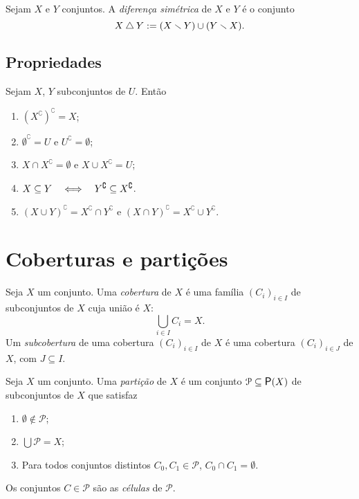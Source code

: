 \begin{definition}
Sejam $X$ e $Y$ conjuntos. A \emph{diferença simétrica} de $X$ e $Y$ é o conjunto
	\begin{equation*}
	X \mathbin{\triangle} Y := (X \smallsetminus Y) \cup (Y \smallsetminus X).
	\end{equation*}
\end{definition}

\subsection{Propriedades}

\begin{proposition}
Sejam $X$, $Y$ subconjuntos de $U$. Então
	\begin{enumerate}
	\item $(X^\complement)^\complement = X$;
	\item $\emptyset^\complement = U$ e $U^\complement = \emptyset$;
	\item $X \cap X^\complement = \emptyset$ e $X \cup X^\complement = U$;
	\item $X \subseteq Y \quad \Longleftrightarrow \quad Y^\complement \subseteq X^\complement$.
	\item $(X \cup Y)^\complement = X^\complement \cap Y^\complement$ e $(X \cap Y)^\complement = X^\complement \cup Y^\complement$.
	\end{enumerate}
\end{proposition}




\section{Coberturas e partições}

\begin{definition}
Seja $X$ um conjunto. Uma \emph{cobertura} de $X$ é uma família $(C_i)_{i \in I}$ de subconjuntos de $X$ cuja união é $X$:
	\begin{equation*}
	\bigcup_{i \in I} C_i = X.
	\end{equation*}
Um \emph{subcobertura} de uma cobertura $(C_i)_{i \in I}$ de $X$ é uma cobertura $(C_i)_{i \in J}$ de $X$, com $J \subseteq I$.
\end{definition}

\begin{definition}
Seja $X$ um conjunto. Uma \emph{partição} de $X$ é um conjunto $\mathcal P \subseteq \p(X)$ de subconjuntos de $X$ que satisfaz
	\begin{enumerate}
	\item $\emptyset \notin \mathcal P$;
	\item $\displaystyle\bigcup \mathcal P = X$;
	\item Para todos conjuntos distintos $C_0,C_1 \in \mathcal P$, $C_0 \cap C_1 = \emptyset$.
	\end{enumerate}
Os conjuntos $C \in \mathcal P$ são as \emph{células} de $\mathcal P$.
\end{definition}

